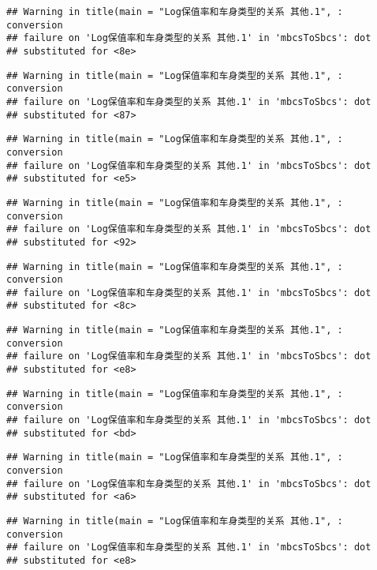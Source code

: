 \documentclass[]{article}
\begin{document}
\begin{verbatim}
## Warning in title(main = "Log保值率和车身类型的关系 其他.1", : conversion
## failure on 'Log保值率和车身类型的关系 其他.1' in 'mbcsToSbcs': dot
## substituted for <8e>
\end{verbatim}

\begin{verbatim}
## Warning in title(main = "Log保值率和车身类型的关系 其他.1", : conversion
## failure on 'Log保值率和车身类型的关系 其他.1' in 'mbcsToSbcs': dot
## substituted for <87>
\end{verbatim}

\begin{verbatim}
## Warning in title(main = "Log保值率和车身类型的关系 其他.1", : conversion
## failure on 'Log保值率和车身类型的关系 其他.1' in 'mbcsToSbcs': dot
## substituted for <e5>
\end{verbatim}

\begin{verbatim}
## Warning in title(main = "Log保值率和车身类型的关系 其他.1", : conversion
## failure on 'Log保值率和车身类型的关系 其他.1' in 'mbcsToSbcs': dot
## substituted for <92>
\end{verbatim}

\begin{verbatim}
## Warning in title(main = "Log保值率和车身类型的关系 其他.1", : conversion
## failure on 'Log保值率和车身类型的关系 其他.1' in 'mbcsToSbcs': dot
## substituted for <8c>
\end{verbatim}

\begin{verbatim}
## Warning in title(main = "Log保值率和车身类型的关系 其他.1", : conversion
## failure on 'Log保值率和车身类型的关系 其他.1' in 'mbcsToSbcs': dot
## substituted for <e8>
\end{verbatim}

\begin{verbatim}
## Warning in title(main = "Log保值率和车身类型的关系 其他.1", : conversion
## failure on 'Log保值率和车身类型的关系 其他.1' in 'mbcsToSbcs': dot
## substituted for <bd>
\end{verbatim}

\begin{verbatim}
## Warning in title(main = "Log保值率和车身类型的关系 其他.1", : conversion
## failure on 'Log保值率和车身类型的关系 其他.1' in 'mbcsToSbcs': dot
## substituted for <a6>
\end{verbatim}

\begin{verbatim}
## Warning in title(main = "Log保值率和车身类型的关系 其他.1", : conversion
## failure on 'Log保值率和车身类型的关系 其他.1' in 'mbcsToSbcs': dot
## substituted for <e8>
\end{verbatim}
\end{document}

